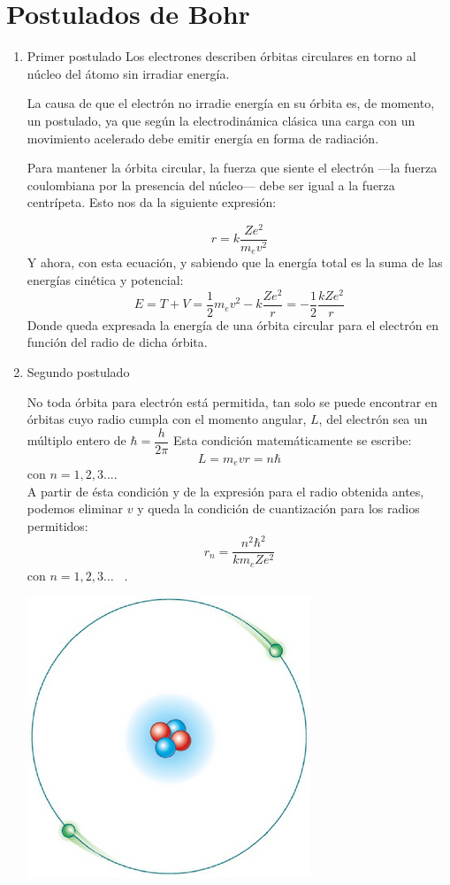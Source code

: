 \documentclass[12pt,a4paper]{article}
\begin{document}
\section{Postulados de Bohr}
\begin{enumerate}
\item Primer postulado
Los electrones describen órbitas circulares en torno al núcleo del átomo sin irradiar energía.

La causa de que el electrón no irradie energía en su órbita es, de momento, un postulado, ya que según la electrodinámica clásica una carga con un movimiento acelerado debe emitir energía en forma de radiación.

Para mantener la órbita circular, la fuerza que siente el electrón —la fuerza coulombiana por la presencia del núcleo— debe ser igual a la fuerza centrípeta. Esto nos da la siguiente expresión:

\begin{equation}
r=k\dfrac{Ze^{2}}{m_{e}v^{2}}
\end{equation}
Y ahora, con esta ecuación, y sabiendo que la energía total es la suma de las energías cinética y potencial:
\begin{equation}
E=T+V=\dfrac{1}{2}m_{e}v^{2}-k\dfrac{Ze^{2}}{r}=-\dfrac{1}{2}\dfrac{kZe^{2}}{r}
\end{equation}
Donde queda expresada la energía de una órbita circular para el electrón en función del radio de dicha órbita.


\item Segundo postulado

\begin{multicols}{2}
No toda órbita para electrón está permitida, tan solo se puede encontrar en órbitas cuyo radio cumpla con el momento angular, $L$, del electrón sea un múltiplo entero de $\hbar=\dfrac{h}{2\pi}$ Esta condición matemáticamente se escribe: $$L=m_{e}vr=n\hbar$$ con $n= 1,2,3...$.\\ A partir de ésta condición y de la expresión para el radio obtenida antes, podemos eliminar $v$ y queda la condición de cuantización para los radios permitidos:
$$r_{n}=\dfrac{n^{2}\hbar^{2}}{km_{e}Ze^{2}}$$ con $n= 1,2,3\ldots$  \ .
\begin{center}
\includegraphics[scale=.4]{MODELO_ATOMICO_DE_BOHR2pos.png}
\end{center}
\end{multicols}



\end{enumerate}
\end{document}
